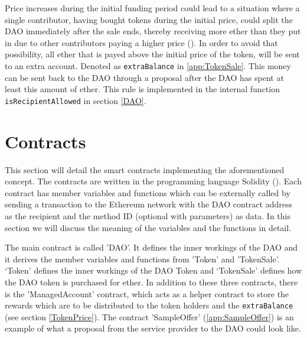 \documentclass[9pt,oneside]{amsart}
\begin{document}
\begin{multicols}{2}
Price increases during the initial funding period could lead to a situation where a single contributor, having bought tokens during the initial price, could split the DAO immediately after the sale ends, thereby receiving more ether than they put in due to other contributors paying a higher price (\cite{GriffDiscussion}).
In order to avoid that possibility, all ether that is payed above the initial price of the token, will be sent to an extra account. Denoted as \verb|extraBalance| in \ref{app:TokenSale}. This money can be sent back to the DAO through a proposal after the DAO has spent at least this amount of ether.
This rule is implemented in the internal function \verb|isRecipientAllowed| in section \ref{DAO}.

\section{Contracts}
This section will detail the smart contracts implementing the aforementioned concept. The contracts are written in the programming language Solidity (\cite{ReitwiessnerWoodSolidity}).
Each contract has member variables and functions which can be externally called by sending a transaction to the Ethereum network with the DAO contract address as the recipient and the method ID (optional with parameters) as data. In this section we will discuss the meaning of the variables and the functions in detail.

The main contract is called 'DAO'. It defines the inner workings of the DAO and it derives the member variables and functions from 'Token' and 'TokenSale'. ‘Token’ defines the inner workings of the DAO Token and ‘TokenSale’ defines how the DAO token is purchased for ether. In addition to these three contracts, there is the 'ManagedAccount' contract, which acts as a helper contract to store the rewards which are to be distributed to the token holders and the \verb|extraBalance| (see section \ref{TokenPrice}).
The contract 'SampleOffer' (\ref{app:SampleOffer}) is an example of what a proposal from the service provider to the DAO could look like.
\end{multicols}
\end{document}
